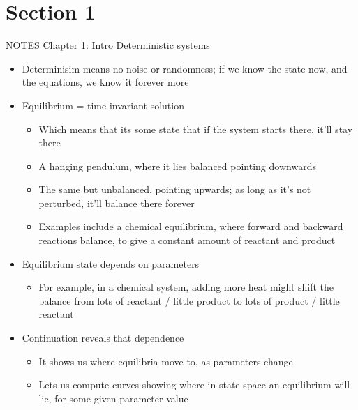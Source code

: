\documentclass[presentation]{beamer}
\begin{document}
\section{Section 1}
\label{sec:orgcda69ee}
\begin{frame}[label={sec:org63ac88a},plain]{NOTES Chapter 1: Intro}
Deterministic systems
\begin{itemize}
\item Determinisim means no noise or randomness; if we know the state now, and the equations, we know it forever more
\item Equilibrium = time-invariant solution
\begin{itemize}
\item Which means that its some state that if the system starts there, it'll stay there
\item A hanging pendulum, where it lies balanced pointing downwards
\item The same but unbalanced, pointing upwards; as long as it's not perturbed, it'll balance there forever
\item Examples include a chemical equilibrium, where forward and backward reactions balance, to give a constant amount of reactant and product
\end{itemize}
\item Equilibrium state depends on parameters
\begin{itemize}
\item For example, in a chemical system, adding more heat might shift the balance from lots of reactant / little product to lots of product / little reactant
\end{itemize}
\item Continuation reveals that dependence
\begin{itemize}
\item It shows us where equilibria move to, as parameters change
\item Lets us compute curves showing where in state space an equilibrium will lie, for some given parameter value
\end{itemize}
\end{itemize}
\end{frame}
\end{document}
